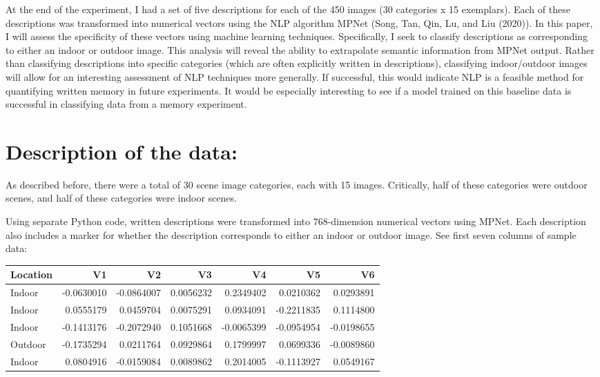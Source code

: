 \documentclass[
  english,
  man]{apa6}
\begin{document}
At the end of the experiment, I had a set of five descriptions for each of the 450 images (30 categories x 15 exemplars). Each of these descriptions was transformed into numerical vectors using the NLP algorithm MPNet (Song, Tan, Qin, Lu, and Liu (2020)). In this paper, I will assess the specificity of these vectors using machine learning techniques. Specifically, I seek to classify descriptions as corresponding to either an indoor or outdoor image. This analysis will reveal the ability to extrapolate semantic information from MPNet output. Rather than classifying descriptions into specific categories (which are often explicitly written in descriptions), classifying indoor/outdoor images will allow for an interesting assessment of NLP techniques more generally. If successful, this would indicate NLP is a feasible method for quantifying written memory in future experiments. It would be especially interesting to see if a model trained on this baseline data is successful in classifying data from a memory experiment.

\hypertarget{description-of-the-data}{%
\section{Description of the data:}\label{description-of-the-data}}

As described before, there were a total of 30 scene image categories, each with 15 images. Critically, half of these categories were outdoor scenes, and half of these categories were indoor scenes.

Using separate Python code, written descriptions were transformed into 768-dimension numerical vectors using MPNet. Each description also includes a marker for whether the description corresponds to either an indoor or outdoor image. See first seven columns of sample data:

\begin{tabular}{l|r|r|r|r|r|r}
\hline
Location & V1 & V2 & V3 & V4 & V5 & V6\\
\hline
Indoor & -0.0630010 & -0.0864007 & 0.0056232 & 0.2349402 & 0.0210362 & 0.0293891\\
\hline
Indoor & 0.0555179 & 0.0459704 & 0.0075291 & 0.0934091 & -0.2211835 & 0.1114800\\
\hline
Indoor & -0.1413176 & -0.2072940 & 0.1051668 & -0.0065399 & -0.0954954 & -0.0198655\\
\hline
Outdoor & -0.1735294 & 0.0211764 & 0.0929864 & 0.1799997 & 0.0699336 & -0.0089860\\
\hline
Indoor & 0.0804916 & -0.0159084 & 0.0089862 & 0.2014005 & -0.1113927 & 0.0549167\\
\hline
\end{tabular}
\end{document}
